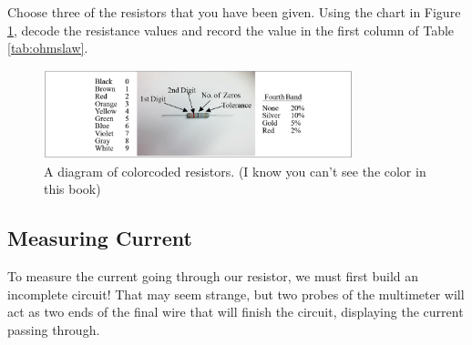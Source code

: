 Choose three of the resistors that you have been given. Using the chart in Figure \ref{fig:resistancechart}, decode the resistance values and record the value in the first column of Table \ref{tab:ohmslaw}.\myskip

\begin{figure}[h]
\centering
\includegraphics[width=0.8\textwidth]{./Exp2/pic/resistancechart.png}
\caption{A diagram of colorcoded resistors. (I know you can't see the color in this book)}
\label{fig:resistancechart}
\end{figure}

\subsection{Measuring Current}
To measure the current going through our resistor, we must first build an incomplete circuit! That may seem strange, but two probes of the multimeter will act as two ends of the final wire that will finish the circuit, displaying the current passing through.\myskip

